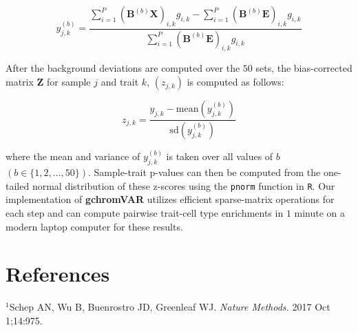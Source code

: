 \documentclass{article}\usepackage[]{graphicx}\usepackage[]{color}
\begin{document}
$$ y_{j,k}^{(b)} = \frac{\sum_{i=1}^P (\boldsymbol{B}^{(b)}\boldsymbol{X})_{i,k}g_{i,k} -\sum_{i=1}^P (\boldsymbol{B}^{(b)}\boldsymbol{E})_{i,k}g_{i,k}}{\sum_{i=1}^P (\boldsymbol{B}^{(b)}\boldsymbol{E})_{i,k}g_{i,k}} $$

\noindent After the background deviations are computed over the $50$ sets, the bias-corrected matrix $\boldsymbol{Z}$ for sample $j$ and trait $k$, $(z_{j,k})$ is computed as follows:

$$ z_{j,k} = \frac{y_{j,k} - \mathrm{mean}(y_{j,k}^{(b)})}{\mathrm{sd}(y_{j,k}^{(b)})} $$

\noindent where the mean and variance of $y_{j,k}^{(b)}$ is taken over all values of $b$ $(b \in \{1,2,...,50\})$. Sample-trait p-values can then be computed from the one-tailed normal distribution of these z-scores using the \texttt{pnorm} function in \texttt{R}. Our implementation of \textbf{gchromVAR} utilizes efficient sparse-matrix operations for each step and can compute pairwise trait-cell type enrichments in $1$ minute on a modern laptop computer for these results.

\section*{References}
\noindent $^1$Schep AN, Wu B, Buenrostro JD, Greenleaf WJ. \textit{Nature Methods.} 2017 Oct 1;14:975. \newline
\end{document}
